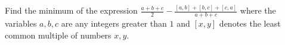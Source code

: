 Find the minimum of the expression  $\frac{a + b + c}{2} -\frac{[a, b] + [b, c] + [c, a]}{a + b + c}$ where the variables $a, b, c$ are any integers greater than $1$ and $[x, y]$ denotes the least common multiple of numbers $x, y$.